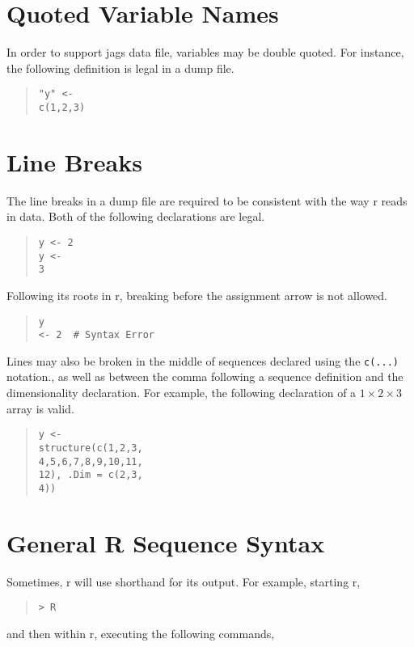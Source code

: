 \documentclass[10pt]{report}
\newcommand{\acronym}[1]{{\sc #1}\xspace}
\newcommand{\R}{\acronym{r}}
\newcommand{\JAGS}{\acronym{jags}}
\newcommand{\code}[1]{{\tt #1}}
\begin{document}
\section{Quoted Variable Names}

In order to support \JAGS data file, variables may be double quoted.
For instance, the following definition is legal in a dump file.
%
\begin{quote}
\begin{Verbatim}
"y" <-
c(1,2,3)
\end{Verbatim}
\end{quote}

\section{Line Breaks}

The line breaks in a dump file are required to be consistent with
the way \R reads in data.  Both of the following declarations are
legal.
%
\begin{quote}
\begin{Verbatim}
y <- 2
y <-
3
\end{Verbatim}
\end{quote}
%
Following its roots in \R, breaking before the assignment arrow is not
allowed.
%
\begin{quote}
\begin{Verbatim}
y
<- 2  # Syntax Error
\end{Verbatim}
\end{quote}

Lines may also be broken in the middle of sequences declared
using the \code{c(...)} notation., as well as between the comma
following a sequence definition and the dimensionality declaration.
For example, the following declaration of a $1 \times 2 \times 3$
array is valid.
%
\begin{quote}
\begin{Verbatim}
y <-
structure(c(1,2,3,
4,5,6,7,8,9,10,11,
12), .Dim = c(2,3,
4))
\end{Verbatim}
\end{quote}

\section{General R Sequence Syntax}

Sometimes, \R will use shorthand for its output. For example,
starting \R,

\begin{quote}
\begin{Verbatim}[fontshape=sl]
> R
\end{Verbatim}
\end{quote}
%
and then within \R, executing the following commands,
\end{document}
